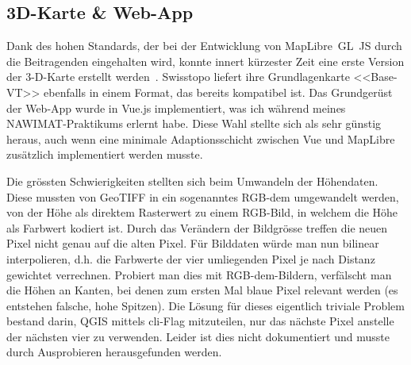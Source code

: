 \subsection{3D-Karte \& Web-App}

Dank des hohen Standards, der bei der Entwicklung von MapLibre~GL~JS durch die Beitragenden eingehalten wird, konnte innert kürzester Zeit eine erste Version der 3-D-Karte erstellt werden~\cite{maplibregljs}. Swisstopo liefert ihre Grundlagenkarte <<Base-VT>> ebenfalls in einem Format, das bereits kompatibel ist. Das Grundgerüst der Web-App wurde in Vue.js implementiert, was ich während meines NAWIMAT-Praktikums erlernt habe. Diese Wahl stellte sich als sehr günstig heraus, auch wenn eine minimale Adaptionsschicht zwischen Vue und MapLibre zusätzlich implementiert werden musste.

Die grössten Schwierigkeiten stellten sich beim Umwandeln der Höhendaten. Diese mussten von GeoTIFF in ein sogenanntes RGB-\acrshort{dem} umgewandelt werden, von der Höhe als direktem Rasterwert zu einem RGB-Bild, in welchem die Höhe als Farbwert kodiert ist. Durch das Verändern der Bildgrösse treffen die neuen Pixel nicht genau auf die alten Pixel. Für Bilddaten würde man nun bilinear interpolieren, d.h. die Farbwerte der vier umliegenden Pixel je nach Distanz gewichtet verrechnen. Probiert man dies mit RGB-\acrshort{dem}-Bildern, verfälscht man die Höhen an Kanten, bei denen zum ersten Mal blaue Pixel relevant werden (es entstehen falsche, hohe Spitzen). Die Lösung für dieses eigentlich triviale Problem bestand darin, QGIS mittels \acrshort{cli}-Flag mitzuteilen, nur das nächste Pixel anstelle der nächsten vier zu verwenden. Leider ist dies nicht dokumentiert und musste durch Ausprobieren herausgefunden werden.

